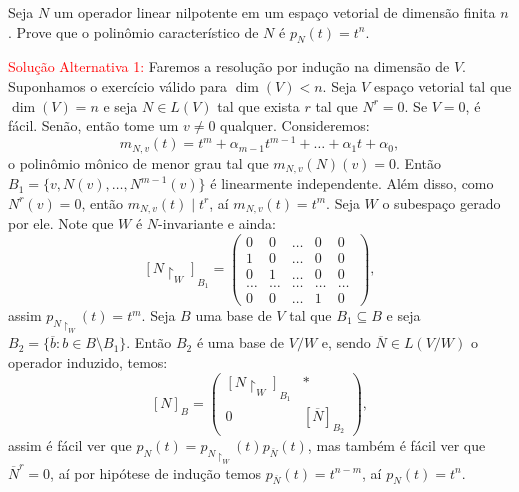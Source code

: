 \documentclass[11pt,a4paper]{article}
\begin{document}
 Seja $N$ um operador linear nilpotente em um espaço vetorial de dimensão finita $n$. Prove
que o polinômio característico de $N$ é $p_N(t) = t^n.$


\bigskip
\noindent
\textcolor{red}{Solução Alternativa 1:} Faremos a resolução por indução na dimensão de $V$. Suponhamos o exercício válido para $\dim(V)<n$. Seja $V$ espaço vetorial tal que $\dim(V)=n$ e seja $N\in L(V)$ tal que exista $r$ tal que $N^r=0$. Se $V=0$, é fácil. Senão, então tome um $v\neq 0$ qualquer. Consideremos:
\[
m_{N,v}(t)=t^m+\alpha_{m-1}t^{m-1}+\dots+\alpha_1 t+\alpha_0,
\]
o polinômio mônico de menor grau tal que \(m_{N,v}(N)(v)=0\). Então \(B_1=\{v,N(v),\ldots, N^{m-1}(v)\}\) é linearmente independente. Além disso, como \(N^r(v)=0\), então $m_{N,v}(t)\mid t^r$, aí $m_{N,v}(t)=t^m$. Seja \(W\) o subespaço gerado por ele. Note que \(W\) é \(N\)-invariante e ainda:
\[[N\upharpoonright_W]_{B_1}=\begin{pmatrix}
0 & 0 & \ldots& 0 & 0
\\ 1 & 0 & \ldots & 0 & 0
\\ 0 & 1 & \ldots & 0 & 0
\\ \ldots & \ldots  & \ldots  & \ldots  & \ldots \
\\ 0 & 0 & \ldots & 1 & 0
\end{pmatrix},\]
assim $p_{N\upharpoonright_W}(t)=t^m$. Seja $B$ uma base de $V$ tal que $B_1\subseteq B$ e seja $B_2=\{\overline{b}:b\in B\setminus B_1\}$. Então $B_2$ é uma base de $V/W$ e, sendo $\overline{N}\in L(V/W)$ o operador induzido, temos:
\[
[N]_B=
\begin{pmatrix}
[N\upharpoonright_W]_{B_1}&*\\0&[\overline{N}]_{B_2}
\end{pmatrix},
\]
assim é fácil ver que $p_N(t)=p_{N\upharpoonright_W}(t)p_{\overline{N}}(t)$, mas também é fácil ver que $\overline{N}^r=0$, aí por hipótese de indução temos $p_{\overline{N}}(t)=t^{n-m}$, aí $p_N(t)=t^n.$
\end{document}
